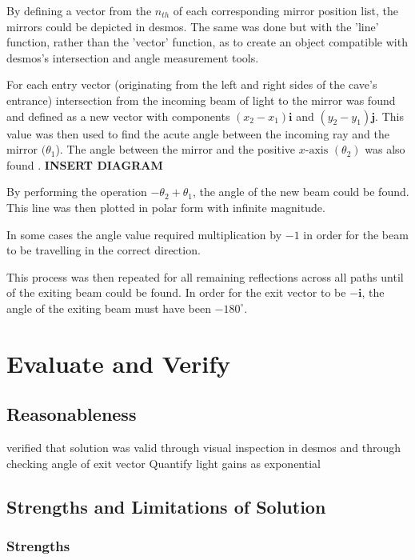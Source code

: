 \documentclass[11pt, letterpaper]{article}
\begin{document}
By defining a vector from the $n_{th}$ of each corresponding mirror position list, the mirrors could be depicted in desmos. The same was done but with the 'line' function, rather than the 'vector' function, as to create an object compatible with desmos's intersection and angle measurement tools.
		
 For each entry vector (originating from the left and right sides of the cave's entrance) intersection from the incoming beam of light to the mirror was found and defined as a new vector with components $(x_2 - x_1)\textbf{i}$ and $(y_2 - y_1)\textbf{j}$. This value was then used to find the acute angle between the incoming ray and the mirror $(\theta _1$). The angle between the mirror and the positive $x\textrm{-axis}$ $(\theta _2)$ was also found .
\newline
\textbf{INSERT DIAGRAM}

By performing the operation $- \theta_2 + \theta_1 $, the angle of the new beam could be found. This line was then plotted in polar form with infinite magnitude.
		

In some cases the angle value required multiplication by $-1$ in order for the beam to be travelling in the correct direction.
		

This process was then repeated for all remaining reflections across all paths until of the exiting beam could be found. In order for the exit vector to be $-\textbf{i}$, the angle of the exiting beam must have been $-180^{\circ}$.
		
	
	
	\section{Evaluate and Verify}
	
	\subsection{Reasonableness}
	
 verified that solution was valid through visual inspection in desmos and through checking angle of exit vector
Quantify light gains as exponential
	
	
\subsection{Strengths and Limitations of Solution}
\subsubsection{Strengths}
	
\end{document}
